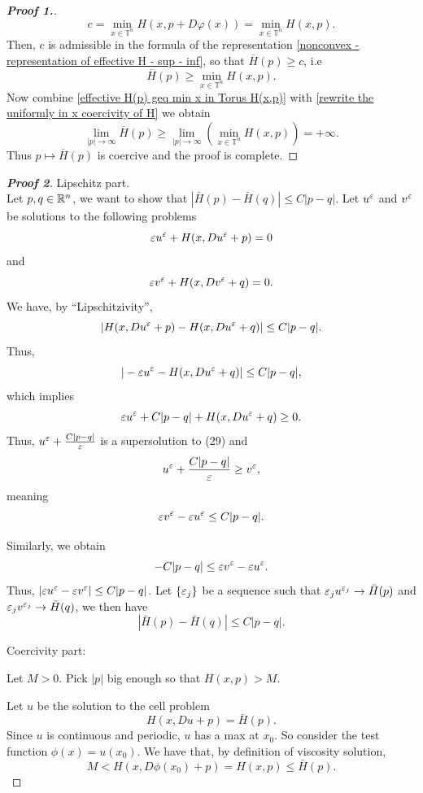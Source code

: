 \documentclass[12pt, oneside]{amsart}  	%
\begin{document}
\begin{proof}[\textbf{Proof 1.}]
\begin{equation*}
c = \min_{x\in \mathbb{T}^n} H(x,p+D\varphi(x)) = \min_{x\in \mathbb{T}^n} H(x,p).
\end{equation*}
Then, $c$ is admissible in the formula of the representation \eqref{nonconvex - representation of effective H - sup - inf}, so that $\overline{H}(p)\geq c$, i.e
\begin{equation}\label{effective H(p) geq min x in Torus H(x,p)}
\overline{H}(p) \geq \min_{x\in \mathbb{T}^n} H(x,p).
\end{equation}
Now combine \eqref{effective H(p) geq min x in Torus H(x,p)} with \eqref{rewrite the uniformly in x coercivity of H} we obtain
\begin{equation*}
\lim_{|p|\longrightarrow \infty} \overline{H}(p) \geq \lim_{|p|\longrightarrow \infty} \left( \min_{x\in \mathbb{T}^n} H(x,p) \right) = +\infty.
\end{equation*}
Thus $p\longmapsto \overline{H}(p)$ is coercive and the proof is complete.
\end{proof}

\begin{proof}[\textbf{Proof 2}] Lipschitz part.\\
Let $p, q\in \mathbb{R}^n$, we want to show that $|\bar{H}(p)-\bar{H}(q)|\le C|p-q|$. Let $u^\varepsilon$ and $v^\varepsilon$ be solutions to the following problems
\begin{equation}
		\varepsilon u^\varepsilon + H(x, Du^\varepsilon + p)=0
\end{equation}
	and
\begin{equation}
		\varepsilon v^\varepsilon + H(x, Dv^\varepsilon + q)=0.
\end{equation}
We have, by ``Lipschitzivity'',
	$$|H(x, Du^\varepsilon + p) - H(x, Du^\varepsilon + q)| \le C|p-q|.$$
Thus,
	$$|-\varepsilon u^\varepsilon - H(x, Du^\varepsilon + q)| \le C|p-q|,$$
which implies
	\begin{equation}
	 \varepsilon u^\varepsilon+C|p-q| + H(x, Du^\varepsilon +q) \ge 0. \label{inequality_1}
	\end{equation}
	Thus, $u^\varepsilon + \frac{C|p-q|}{\varepsilon}$ is a supersolution to (29) and
	$$u^\varepsilon + \frac{C|p-q|}{\varepsilon}\ge v^\varepsilon,$$
	meaning $$\varepsilon v^\varepsilon-\varepsilon u^\varepsilon \le C|p-q|.$$

	Similarly, we obtain
	$$-C|p-q| \le \varepsilon v^\varepsilon-\varepsilon u^\varepsilon .$$
	Thus, $|\varepsilon u^\varepsilon - \varepsilon v^\varepsilon| \le C|p-q|$. Let $\{ \varepsilon_j\}$ be a sequence such that $\varepsilon_j u^{\varepsilon_j} \to \bar{H}(p)$ and $\varepsilon_j v^{\varepsilon_j} \to \bar{H}(q)$, we then have
	$$|\bar{H}(p)- \bar{H}(q)| \le C|p-q|.$$

	Coercivity part:

	Let $M>0$. Pick $|p|$ big enough so that $H(x,p)>M$.

	Let $u$ be the solution to the cell problem
	$$H(x, Du+p) = \bar{H}(p).$$
	Since $u$ is continuous and periodic, $u$ has a max at $x_0$. So consider the test function $\phi(x)={u(x_0)}$. We have that, by definition of viscosity solution,
	$$M< H(x,D\phi(x_0)+p)=H(x,p) \le \bar{H}(p).$$
\end{proof}
\end{document}

